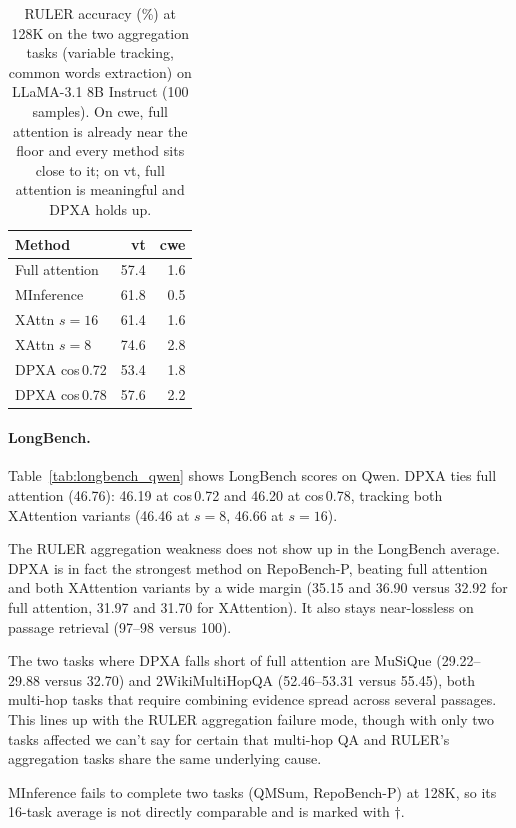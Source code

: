 \begin{table}[!ht]
\centering
\caption{RULER accuracy (\%) at 128K on the two aggregation tasks (variable tracking, common words extraction) on LLaMA-3.1 8B Instruct (100 samples). On cwe, full attention is already near the floor and every method sits close to it; on vt, full attention is meaningful and DPXA holds up.}
\label{tab:ruler_pertask_llama_agg}
\begin{tabular}{lrr}
\toprule
Method & vt & cwe \\
\midrule
Full attention & 57.4 & 1.6 \\
MInference     & 61.8 & 0.5 \\
\midrule
XAttn $s{=}16$ & 61.4 & 1.6 \\
XAttn $s{=}8$  & 74.6 & 2.8 \\
\midrule
DPXA cos\,0.72 & 53.4 & 1.8 \\
DPXA cos\,0.78 & 57.6 & 2.2 \\
\bottomrule
\end{tabular}
\end{table}

\paragraph{LongBench.}

Table~\ref{tab:longbench_qwen} shows LongBench scores on Qwen. DPXA ties full attention (46.76): 46.19 at cos\,0.72 and 46.20 at cos\,0.78, tracking both XAttention variants (46.46 at $s{=}8$, 46.66 at $s{=}16$).

The RULER aggregation weakness does not show up in the LongBench average. DPXA is in fact the strongest method on RepoBench-P, beating full attention and both XAttention variants by a wide margin (35.15 and 36.90 versus 32.92 for full attention, 31.97 and 31.70 for XAttention). It also stays near-lossless on passage retrieval (97--98 versus 100).

The two tasks where DPXA falls short of full attention are MuSiQue (29.22--29.88 versus 32.70) and 2WikiMultiHopQA (52.46--53.31 versus 55.45), both multi-hop tasks that require combining evidence spread across several passages. This lines up with the RULER aggregation failure mode, though with only two tasks affected we can't say for certain that multi-hop QA and RULER's aggregation tasks share the same underlying cause.

MInference fails to complete two tasks (QMSum, RepoBench-P) at 128K, so its 16-task average is not directly comparable and is marked with $\dagger$.

